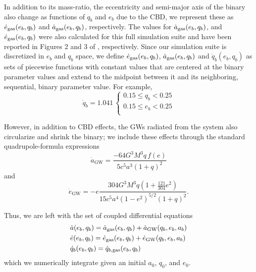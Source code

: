 \documentclass[fleqn,usenatbib]{mnras}
\begin{document}
In addition to its mass-ratio, the eccentricity and semi-major axis of the binary also change as functions of $q_b$ and $e_b$ due to the CBD, we represent these as $\dot{e}_{\rm{gas}}(e_b, q_b)$ and $\dot{a}_{\rm{gas}}(e_b, q_b)$, respectively. The values for $\dot{a}_{\rm{gas}}(e_b, q_b)$, and $\dot{e}_{\rm{gas}}(e_b, q_b)$ were also calculated for this full simulation suite and have been reported in Figures 2 and 3 of \citealt{siwek_cbdorbevol}, respectively. Since our simulation suite is discretized in $e_b$ and $q_b$ space, we define $\dot{e}_{\rm{gas}}(e_b, q_b)$, $\dot{a}_{\rm{gas}}(e_b, q_b)$ and $\dot{q}_b(e_b, q_b)$ as sets of piecewise functions with constant values that are centered at the binary parameter values and extend to the midpoint between it and its neighboring, sequential, binary parameter value. For example,
\begin{equation}
    \dot{q}_b =1.041 \,
    \begin{cases}
     0.15 \leq q_b < 0.25 \\
      0.15 \leq e_b < 0.25 \\
\end{cases}
\end{equation}

However, in addition to CBD effects, the GWs radiated from the system also circularize and shrink the binary; we include these effects through the standard quadrupole-formula expressions \citep{peters_64}
\begin{equation}
    \dot{a}_{\text{GW}} = \frac{-64 G^3 M^3 q \, f(e)}{5 c^5 a^3 (1+q)^2}
\end{equation}
and
\begin{equation}
    \dot{e}_{\text{GW}} = -e\frac{ 304 G^3 M^3 q \left( 1 + \frac{121}{304} e^2 \right)}{15 c^5 a^4 \left( 1 - e^2 \right)^{5/2} (1 + q)^2}.
\end{equation}

Thus, we are left with the set of coupled differential equations
\begin{align}\label{eqn:num_integ}
    & \dot{a}(e_b, q_b) = \dot{a}_{\rm{gas}}(e_b, q_b) + \dot{a}_{\rm{GW}}(q_b, e_b, a_b) \\
    & \dot{e}(e_b, q_b) = \dot{e}_{\rm{gas}}(e_b, q_b) + \dot{e}_{\rm{GW}}(q_b, e_b, a_b) \\
    & \dot{q}_b(e_b, q_b) = \dot{q}_{b,\rm gas}(e_b, q_b) \\
\end{align}
which we numerically integrate given an initial $a_0$, $q_0$, and $e_0$.
\end{document}
